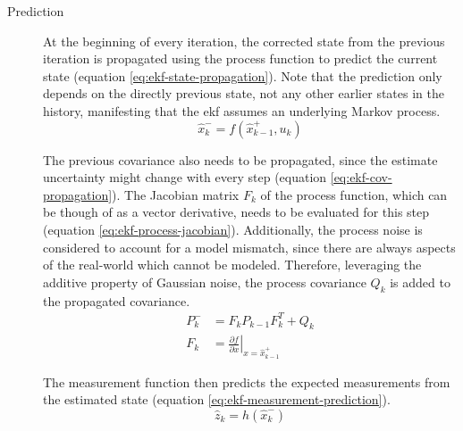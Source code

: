 \begin{description}
\item[Prediction] At the beginning of every iteration, the corrected state from the previous iteration is propagated using the process function to predict the current state (equation \ref{eq:ekf-state-propagation}). Note that the prediction only depends on the directly previous state, not any other earlier states in the history, manifesting that the \gls{ekf} assumes an underlying Markov process.
\begin{equation}\label{eq:ekf-state-propagation}%
\hat{x}_k^- = f(\hat{x}_{k-1}^+, u_k)%
\end{equation}

The previous covariance also needs to be propagated, since the estimate uncertainty might change with every step (equation \ref{eq:ekf-cov-propagation}). The Jacobian matrix $F_k$ of the process function, which can be though of as a vector derivative, needs to be evaluated for this step (equation \ref{eq:ekf-process-jacobian}). Additionally, the process noise is considered to account for a model mismatch, since there are always aspects of the real-world which cannot be modeled. Therefore, leveraging the additive property of Gaussian noise, the process covariance $Q_k$ is added to the propagated covariance.
\begin{align}\label{eq:ekf-cov-propagation}%
P_k^- &= F_k P_{k-1} F_k^T + Q_k \\%
\label{eq:ekf-process-jacobian}%
F_k &= \left. \frac{\partial f}{\partial x} \right|_{x = \hat{x}_{k-1}^+}%
\end{align}

The measurement function then predicts the expected measurements from the estimated state (equation \ref{eq:ekf-measurement-prediction}).
\begin{equation}\label{eq:ekf-measurement-prediction}%
\hat{z}_k = h(\hat{x}_k^-)%
\end{equation}



\end{description}
